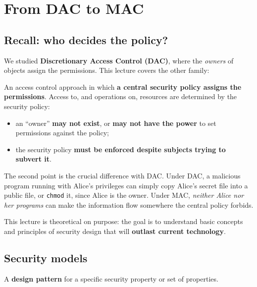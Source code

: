

\section{From DAC to MAC}

\subsection{Recall: who decides the policy?}

We studied \textbf{Discretionary Access Control (DAC)}, where the \emph{owners} of objects assign the permissions. This lecture covers the other family:

\begin{definition}
An access control approach in which \textbf{a central security policy assigns the permissions}. Access to, and operations on, resources are determined by the security policy:
\begin{itemize}
    \item an ``owner'' \textbf{may not exist}, or \textbf{may not have the power} to set permissions against the policy;
    \item the security policy \textbf{must be enforced despite subjects trying to subvert it}.
\end{itemize}
\end{definition}

\begin{remark}
The second point is the crucial difference with DAC. Under DAC, a malicious program running with Alice's privileges can simply copy Alice's secret file into a public file, or \texttt{chmod} it, since Alice is the owner. Under MAC, \emph{neither Alice nor her programs} can make the information flow somewhere the central policy forbids.
\end{remark}

This lecture is theoretical on purpose: the goal is to understand basic concepts and principles of security design that will \textbf{outlast current technology}.

\subsection{Security models}

\begin{definition}
A \textbf{design pattern} for a specific security property or set of properties.
\end{definition}

